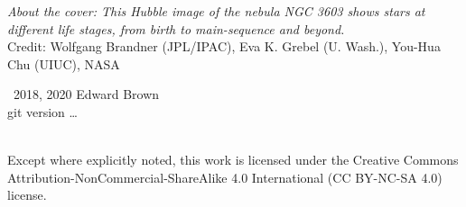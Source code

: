 
\maketitle
\newpage
\begin{fullwidth}
\thispagestyle{empty}

\vspace{3\baselineskip}
\noindent \textit{About the cover: This Hubble image of the nebula NGC 3603 shows stars at different life stages, from birth to main-sequence and beyond.} \\
\noindent Credit: Wolfgang Brandner (JPL/IPAC), Eva K. Grebel (U. Wash.), You-Hua Chu (UIUC), NASA

\vfill
\noindent \ccCopy\ 2018, 2020 Edward Brown\\
\noindent git version \ldots

\vspace{3\baselineskip}
\noindent \ccbyncsa \\
\noindent Except where explicitly noted, this work is licensed under the Creative Commons
Attribution-NonCommercial-ShareAlike 4.0 International (CC BY-NC-SA
4.0) license.

\end{fullwidth}

\newpage


\tableofcontents
\listoffigures
\listoftables
\listofsidebars
\listofexercises
